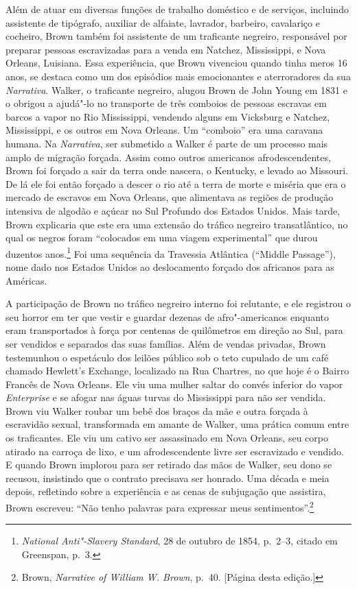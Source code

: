 Além de atuar em diversas funções de trabalho doméstico e de serviços,
incluindo assistente de tipógrafo, auxiliar de alfaiate, lavrador,
barbeiro, cavalariço e cocheiro, Brown também foi assistente de um
traficante negreiro, responsável por preparar pessoas escravizadas
para a venda em Natchez, Mississippi, e Nova Orleans, Luisiana. Essa
experiência, que Brown vivenciou quando tinha meros 16 anos, se destaca
como um dos episódios mais emocionantes e aterroradores da sua
\emph{Narrativa}. Walker, o traficante negreiro, alugou Brown de John
Young em 1831 e o obrigou a ajudá"-lo no transporte de três comboios de
pessoas escravas em barcos a vapor no Rio Mississippi, vendendo
alguns em Vicksburg e Natchez, Mississippi, e os outros em Nova Orleans.
Um ``comboio'' era uma caravana humana. Na \emph{Narrativa}, ser
submetido a Walker é parte de um processo mais amplo de migração
forçada. Assim como outros americanos afrodescendentes, Brown foi
forçado a sair da terra onde nascera, o Kentucky, e levado ao Missouri.
De lá ele foi então forçado a descer o rio até a terra de morte e
miséria que era o mercado de escravos em Nova Orleans, que alimentava as
regiões de produção intensiva de algodão e açúcar no Sul Profundo dos
Estados Unidos. Mais tarde, Brown explicaria que este era uma extensão
do tráfico negreiro transatlântico, no qual os negros foram
``colocados em uma viagem experimental'' que durou duzentos
anos.\footnote{\emph{National Anti"-Slavery Standard}, 28 de outubro de
  1854, p.~2--3, citado em Greenspan, p.~3.} Foi uma sequência da Travessia
Atlântica (``Middle Passage''), nome dado nos Estados Unidos ao
deslocamento forçado dos africanos para as Américas.

A participação de Brown no tráfico negreiro interno foi relutante, e
ele registrou o seu horror em ter que vestir e guardar dezenas de
afro"-americanos enquanto eram transportados à força por centenas de
quilômetros em direção ao Sul, para ser vendidos e separados das suas
famílias. Além de vendas privadas, Brown testemunhou o espetáculo dos
leilões público sob o teto cupulado de um café chamado Hewlett's
Exchange, localizado na Rua Chartres, no que hoje é o Bairro Francês de
Nova Orleans. Ele viu uma mulher saltar do convés inferior do vapor
\emph{Enterprise} e se afogar nas águas turvas do Mississippi para não
ser vendida. Brown viu Walker roubar um bebê dos braços da mãe e outra
forçada à escravidão sexual, transformada em amante de Walker, uma
prática comum entre os traficantes. Ele viu um cativo ser
assassinado em Nova Orleans, seu corpo atirado na carroça de lixo, e um
afrodescendente livre ser escravizado e vendido. E quando Brown implorou
para ser retirado das mãos de Walker, seu dono se recusou, insistindo
que o contrato precisava ser honrado. Uma década e meia depois,
refletindo sobre a experiência e as cenas de subjugação que assistira,
Brown escreveu: ``Não tenho palavras para expressar meus
sentimentos''.\footnote{Brown, \emph{Narrative of William W. Brown}, p.~40.
  {[}Página \pageref{ref6} desta edição.{]}}

